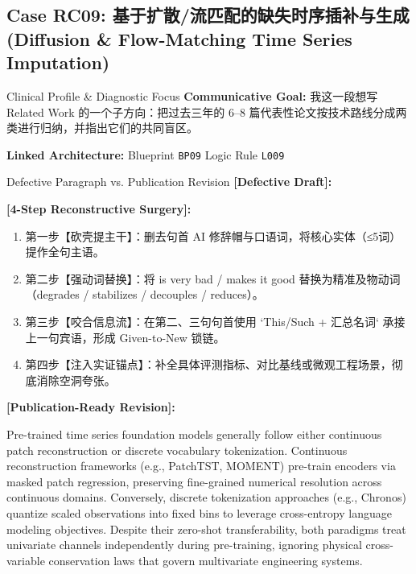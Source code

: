\subsection{Case RC09: 基于扩散/流匹配的缺失时序插补与生成 (Diffusion \& Flow-Matching Time Series Imputation)}\label{case:RC09}
\begin{ConceptBox}{Clinical Profile \& Diagnostic Focus}
\textbf{Communicative Goal:} 我这一段想写 Related Work 的一个子方向：把过去三年的 6--8 篇代表性论文按技术路线分成两类进行归纳，并指出它们的共同盲区。\par
\textbf{Linked Architecture:} Blueprint \texttt{BP09} \enspace\textbar\enspace Logic Rule \texttt{L009}
\end{ConceptBox}
\begin{ExampleBox}{Defective Paragraph vs. Publication Revision}
\textbf{\color{TargetHighlight}[Defective Draft]:}\par
{}\par\vspace{6pt}
\textbf{\color{AcadForest}[4-Step Reconstructive Surgery]:}
\begin{enumerate}[label=\textbf{\color{AcadNavy}Step \arabic*:}, leftmargin=2em]
  \item 第一步【砍壳提主干】：删去句首 AI 修辞帽与口语词，将核心实体（≤5词）提作全句主语。
  \item 第二步【强动词替换】：将 is very bad / makes it good 替换为精准及物动词（degrades / stabilizes / decouples / reduces）。
  \item 第三步【咬合信息流】：在第二、三句句首使用 `This/Such + 汇总名词` 承接上一句宾语，形成 Given-to-New 锁链。
  \item 第四步【注入实证锚点】：补全具体评测指标、对比基线或微观工程场景，彻底消除空洞夸张。
\end{enumerate}\vspace{4pt}
\textbf{\color{AcadNavy}[Publication-Ready Revision]:}\par
Pre-trained time series foundation models generally follow either continuous patch reconstruction or discrete vocabulary tokenization. Continuous reconstruction frameworks (e.g., PatchTST, MOMENT) pre-train encoders via masked patch regression, preserving fine-grained numerical resolution across continuous domains. Conversely, discrete tokenization approaches (e.g., Chronos) quantize scaled observations into fixed bins to leverage cross-entropy language modeling objectives. Despite their zero-shot transferability, both paradigms treat univariate channels independently during pre-training, ignoring physical cross-variable conservation laws that govern multivariate engineering systems.
\end{ExampleBox}
